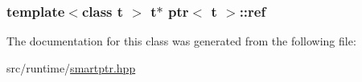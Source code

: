 \subsubsection[{\texorpdfstring{ref}{ref}}]{\setlength{\rightskip}{0pt plus 5cm}template$<$class t $>$ t$\ast$ {\bf ptr}$<$ t $>$\+::ref\hspace{0.3cm}{\ttfamily [private]}}\hypertarget{classptr_ad7ba383d91da4c7a3a8efea91034f12e}{}\label{classptr_ad7ba383d91da4c7a3a8efea91034f12e}


The documentation for this class was generated from the following file\+:\begin{DoxyCompactItemize}
\item 
src/runtime/\hyperlink{smartptr_8hpp}{smartptr.\+hpp}\end{DoxyCompactItemize}
